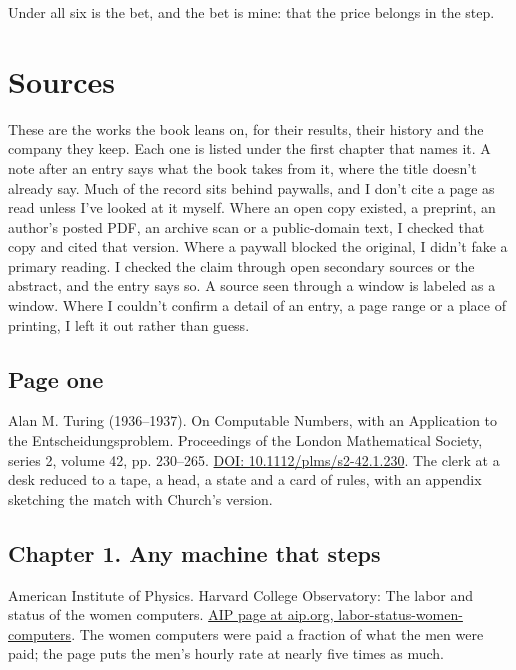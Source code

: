 \documentclass[11pt,twoside]{article}
\theoremstyle{thielethm}
\theoremstyle{thieledef}
\theoremstyle{thieledef}
\theoremstyle{thieledef}
\theoremstyle{thielethm}
\theoremstyle{thieleobs}
\theoremstyle{thielethm}
\begin{document}
Under all six is the bet, and the bet is mine: that the price belongs in the step.

\section*{Sources}
\label{sec:sources}

These are the works the book leans on, for their results, their history and the company they keep. Each one is listed under the first chapter that names it. A note after an entry says what the book takes from it, where the title doesn't already say. Much of the record sits behind paywalls, and I don't cite a page as read unless I've looked at it myself. Where an open copy existed, a preprint, an author's posted PDF, an archive scan or a public-domain text, I checked that copy and cited that version. Where a paywall blocked the original, I didn't fake a primary reading. I checked the claim through open secondary sources or the abstract, and the entry says so. A source seen through a window is labeled as a window. Where I couldn't confirm a detail of an entry, a page range or a place of printing, I left it out rather than guess.

\subsection*{Page one}

\noindent Alan M. Turing (1936--1937). On Computable Numbers, with an Application to the Entscheidungsproblem. Proceedings of the London Mathematical Society, series 2, volume 42, pp. 230--265. \href{https://doi.org/10.1112/plms/s2-42.1.230}{DOI: 10.1112/plms/s2-42.1.230}. The clerk at a desk reduced to a tape, a head, a state and a card of rules, with an appendix sketching the match with Church's version.
\par\medskip

\subsection*{Chapter 1. Any machine that steps}

\noindent American Institute of Physics. Harvard College Observatory: The labor and status of the women computers. \href{https://www.aip.org/history/harvard-observatory/labor-status-women-computers}{AIP page at aip.org, labor-status-women-computers}. The women computers were paid a fraction of what the men were paid; the page puts the men's hourly rate at nearly five times as much.
\par\medskip
\end{document}
